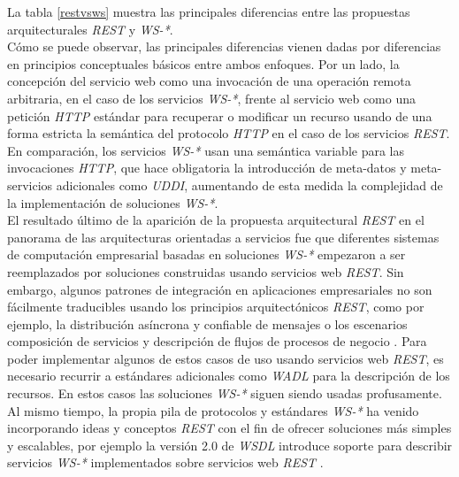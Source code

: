 La tabla \ref{restvsws} muestra las principales diferencias entre las propuestas arquitecturales \textit{REST} y \textit{WS-*}.\\
C\'omo se puede observar, las principales diferencias vienen dadas por diferencias en principios conceptuales b\'asicos entre ambos enfoques. Por un lado, la concepci\'on del servicio web como una invocaci\'on de una operaci\'on remota arbitraria, en el caso de los servicios \textit{WS-*}, frente al servicio web como una petici\'on \textit{HTTP} est\'andar para recuperar o modificar un recurso usando de una forma estricta la sem\'antica del protocolo \textit{HTTP} en el caso de los servicios \textit{REST}. En comparaci\'on, los servicios \textit{WS-*} usan una sem\'antica variable para las invocaciones \textit{HTTP}, que hace obligatoria la introducci\'on de meta-datos y meta-servicios adicionales como \textit{UDDI}, aumentando de esta medida la complejidad de la implementaci\'on de soluciones \textit{WS-*}.\\

El resultado \'ultimo de la aparici\'on de la propuesta arquitectural \textit{REST} en el panorama de las arquitecturas orientadas a servicios fue que diferentes sistemas de computaci\'on empresarial basadas en soluciones \textit{WS-*} empezaron a ser reemplazados por soluciones construidas usando servicios web \textit{REST}. Sin embargo, algunos patrones de integraci\'on en aplicaciones empresariales no son f\'acilmente traducibles usando los principios arquitect\'onicos \textit{REST}, como por ejemplo, la distribuci\'on as\'incrona y confiable de mensajes o los escenarios composici\'on de servicios y descripci\'on de flujos de procesos de negocio \cite{pautasso2008restful}. Para poder implementar algunos de estos casos de uso usando servicios web \textit{REST}, es necesario recurrir a est\'andares adicionales como \textit{WADL} \cite{wadl} para la descripci\'on de los recursos. En estos casos las soluciones \textit{WS-*} siguen siendo usadas profusamente.\\

Al mismo tiempo, la propia pila de protocolos y est\'andares \textit{WS-*} ha venido incorporando ideas y conceptos \textit{REST} con el fin de ofrecer soluciones m\'as simples y escalables, por ejemplo la versi\'on 2.0 de \textit{WSDL} introduce soporte para describir servicios \textit{WS-*} implementados sobre servicios web \textit{REST} \cite{takase2008definition}.\\

